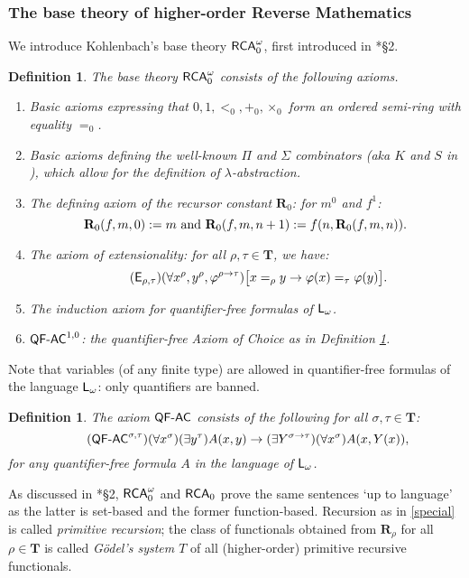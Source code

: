 \documentclass[reqno]{amsart}
\newtheorem{defi}[thm]{Definition}
\newcommand\be{\begin{equation}}
\newcommand\ee{\end{equation}}
\def\bdefi{\begin{defi}\rm}
\def\edefi{\end{defi}}
\def\RCA{\textup{\textsf{RCA}}}
\def\RCAo{\textup{\textsf{RCA}}_{0}^{\omega}}
\def\L{\textsf{\textup{L}}}
\def\di{\rightarrow}
\def\QFAC{\textup{\textsf{QF-AC}}}
\def\INDD{\mathbf{IND}}
\numberwithin{equation}{section}
\numberwithin{thm}{section}
\begin{document}
\subsubsection{The base theory of higher-order Reverse Mathematics}\label{rmbt}
We introduce Kohlenbach's base theory $\RCAo$, first introduced in \cite{kohlenbach2}*{\S2}.
\bdefi\label{kase} 
The base theory $\RCAo$ consists of the following axioms.
\begin{enumerate}
 \renewcommand{\theenumi}{\alph{enumi}}
\item  Basic axioms expressing that $0, 1, <_{0}, +_{0}, \times_{0}$ form an ordered semi-ring with equality $=_{0}$.
\item Basic axioms defining the well-known $\Pi$ and $\Sigma$ combinators (aka $K$ and $S$ in \cite{avi2}), which allow for the definition of \emph{$\lambda$-abstraction}. 
\item The defining axiom of the recursor constant $\mathbf{R}_{0}$: for $m^{0}$ and $f^{1}$: 
\be\label{special}
\mathbf{R}_{0}(f, m, 0):= m \textup{ and } \mathbf{R}_{0}(f, m, n+1):= f(n, \mathbf{R}_{0}(f, m, n)).
\ee
\item The \emph{axiom of extensionality}: for all $\rho, \tau\in \mathbf{T}$, we have:
\be\label{EXT}\tag{$\textsf{\textup{E}}_{\rho, \tau}$}  
(\forall  x^{\rho},y^{\rho}, \varphi^{\rho\di \tau}) \big[x=_{\rho} y \di \varphi(x)=_{\tau}\varphi(y)   \big].
\ee 
\item The induction axiom for quantifier-free formulas of $\L_{\omega}$.
\item $\QFAC^{1,0}$: the quantifier-free Axiom of Choice as in Definition \ref{QFAC}.
\end{enumerate}
\edefi
\noindent
Note that variables (of any finite type) are allowed in quantifier-free formulas of the language $\L_{\omega}$: only quantifiers are banned.
\bdefi\label{QFAC} The axiom $\QFAC$ consists of the following for all $\sigma, \tau \in \textbf{T}$:
\be\tag{$\QFAC^{\sigma,\tau}$}
(\forall x^{\sigma})(\exists y^{\tau})A(x, y)\di (\exists Y^{\sigma\di \tau})(\forall x^{\sigma})A(x, Y(x)),
\ee
for any quantifier-free formula $A$ in the language of $\L_{\omega}$.
\edefi
As discussed in \cite{kohlenbach2}*{\S2}, $\RCAo$ and $\RCA_{0}$ prove the same sentences `up to language' as the latter is set-based and the former function-based.  Recursion as in \eqref{special} is called \emph{primitive recursion}; the class of functionals obtained from $\mathbf{R}_{\rho}$ for all $\rho \in \mathbf{T}$ is called \emph{G\"odel's system $T$} of all (higher-order) primitive recursive functionals.  
\end{document}
